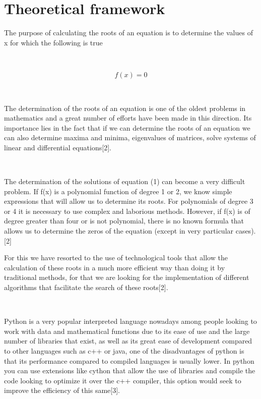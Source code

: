 \documentclass[conference]{IEEEtran}
\begin{document}
\section{Theoretical framework}

The purpose of calculating the roots of an equation is to determine the values of x for which the following is true 

\ 

\begin{equation}
 f(x)= 0
\end{equation}                                                    

\

The determination of the roots of an equation is one of the oldest problems in mathematics and a great number of efforts have been made in this direction. Its importance lies in the fact that if we can determine the roots of an equation we can also determine maxima and minima, eigenvalues of matrices, solve systems of linear and differential equations[2].

\ 

The determination of the solutions of equation (1) can become a very difficult problem. If f(x) is a polynomial function of degree 1 or 2, we know simple expressions that will allow us to determine its roots. For polynomials of degree 3 or 4 it is necessary to use complex and laborious methods. However, if f(x) is of degree greater than four or is not polynomial, there is no known formula that allows us to determine the zeros of the equation (except in very particular cases).[2]


For this we have resorted to the use of technological tools that allow the calculation of these roots in a much more efficient way than doing it by traditional methods, for that we are looking for the implementation of different algorithms that facilitate the search of these roots[2].



\ 

Python is a very popular interpreted language nowadays among people looking to work with data and mathematical functions due to its ease of use and the large number of libraries that exist, as well as its great ease of development compared to other languages such as c++ or java, one of the disadvantages of python is that its performance compared to compiled languages is usually lower. In python you can use extensions like cython that allow the use of libraries and compile the code looking to optimize it over the c++ compiler, this option would seek to improve the efficiency of this same[3].
\end{document}

